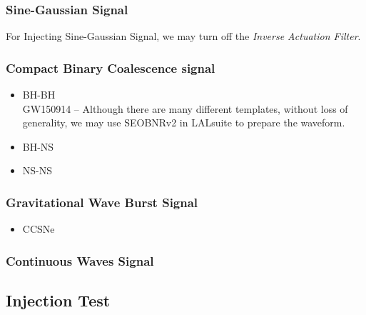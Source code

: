     \subsubsection{Sine-Gaussian Signal}
    For Injecting Sine-Gaussian Signal, we may turn off the \emph{Inverse Actuation Filter}.
    
    
    \subsubsection{Compact Binary Coalescence signal}
        \begin{itemize}
            \item BH-BH\\
            GW150914 -- Although there are many different templates, without loss of generality, we may use SEOBNRv2 in LALsuite to prepare the waveform.
            \item BH-NS
            \item NS-NS\\
        \end{itemize}
    \subsubsection{Gravitational Wave Burst Signal}
        \begin{itemize}
            \item CCSNe
        \end{itemize}
    \subsubsection{Continuous Waves Signal}

\subsection{Injection Test}
